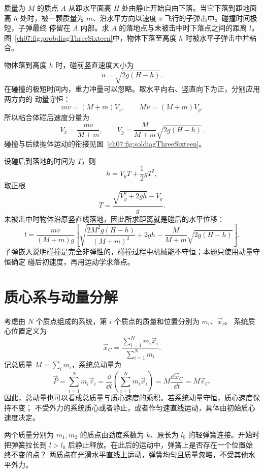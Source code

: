 {
\begin{origexamplebox}{}\label{ch07:ex:s08-3-16}
质量为 $M$ 的质点 $A$ 从距水平面高 $H$ 处由静止开始自由下落。当它下落到距地面高 $h$
处时，被一颗质量为 $m$、沿水平方向以速度 $v$ 飞行的子弹击中。碰撞时间极短，子弹最终
停留在 $A$ 内部。求 $A$ 的落地点与未被击中时下落点之间的距离 $l$。
图~\ref{ch07:fig:probdiagThreeSixteen}中，物体下落至高度 $h$ 时被水平子弹击中并粘合。
\probdiagThreeSixteen
\end{origexamplebox}

\begin{xesolution}
物体落到高度 $h$ 时，碰前竖直速度大小为
\[
 u=\sqrt{2g(H-h)}.
\]
在碰撞的极短时间内，重力冲量可以忽略。取水平向右、竖直向下为正，分别应用两方向的
动量守恒：
\[
 mv=(M+m)V_x,
 \qquad
 Mu=(M+m)V_y.
\]
所以粘合体碰后速度分量为
\[
 V_x=\frac{mv}{M+m},
 \qquad
 V_y=\frac{M}{M+m}\sqrt{2g(H-h)}.
\]
碰撞与后续抛体运动的衔接见图~\ref{ch07:fig:soldiagThreeSixteen}。

\soldiagThreeSixteen
设碰后到落地的时间为 $T$，则
\[
 h=V_yT+\frac12gT^2,
\]
取正根
\[
 T=\frac{\sqrt{V_y^2+2gh}-V_y}{g}.
\]
未被击中时物体沿原竖直线落地，因此所求距离就是碰后的水平位移：
\[
 \boxed{
 l=\frac{mv}{(M+m)g}
 \left[
 \sqrt{\frac{2M^2g(H-h)}{(M+m)^2}+2gh}
 -\frac{M}{M+m}\sqrt{2g(H-h)}
 \right]}.
\]
子弹嵌入说明碰撞是完全非弹性的，碰撞过程中机械能不守恒；本题只使用动量守恒确定
碰后初速度，再用运动学求落点。
\end{xesolution}

\section{质心系与动量分解}

考虑由 $N$ 个质点组成的系统，第 $i$ 个质点的质量和位置分别为 $m_i$、$\vec x_i$。
系统质心位置定义为
\begin{equation}
 \vec x_C=\frac{\sum_{i=1}^{N}m_i\vec x_i}{\sum_{i=1}^{N}m_i}.
\end{equation}
记总质量 $M=\sum_i m_i$，系统总动量为
\begin{equation}
 \vec P=\sum_{i=1}^{N}m_i\vec v_i
 =\frac{\dd}{\dd t}\left(\sum_{i=1}^{N}m_i\vec x_i\right)
 =M\frac{\dd\vec x_C}{\dd t}=M\vec v_C.
\end{equation}
因此，总动量也可以看成总质量与质心速度的乘积。若系统动量守恒，质心速度保持不变；
不受外力的系统质心或者静止，或者作匀速直线运动，具体由初始质心速度决定。

\begin{origexamplebox}{}\label{ch07:ex:s08-3-17}
两个质量分别为 $m_1,m_2$ 的质点由劲度系数为 $k$、原长为 $l_0$ 的轻弹簧连接。开始时
把弹簧拉长到 $l>l_0$ 后静止释放。在此后的运动中，弹簧上是否存在一个位置始终不变的点？
两质点在光滑水平直线上运动，弹簧均匀且质量忽略，不受其他水平外力。


\end{origexamplebox}}

